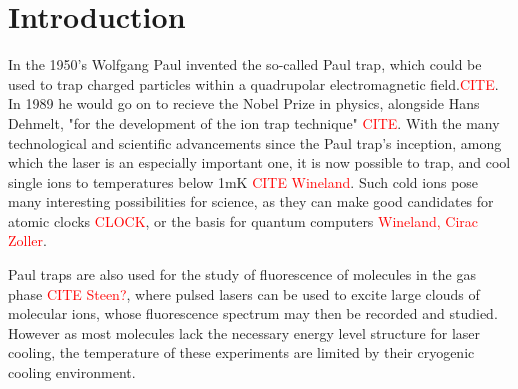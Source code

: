 
\chapter{Introduction}
\label{chap:intro}
In the 1950's Wolfgang Paul invented the so-called Paul trap, which could be used to trap charged particles within a quadrupolar electromagnetic field.\textcolor{red}{CITE}. In 1989 he would go on
 to recieve the Nobel Prize in physics, alongside Hans Dehmelt, "for the development of the ion trap technique" \textcolor{red}{CITE}.
 With the many technological and scientific advancements since the Paul trap's inception, among which the laser is an especially important one,
 it is now possible to trap, and cool single ions to temperatures below 1mK \textcolor{red}{CITE Wineland}.
 Such cold ions pose many interesting possibilities for science, as they can make good candidates for atomic clocks \textcolor{red}{CLOCK},
 or the basis for quantum computers \textcolor{red}{Wineland, Cirac Zoller}.

Paul traps are also used for the study of fluorescence of molecules in the gas phase \textcolor{red}{CITE Steen?},
where pulsed lasers can be used to excite large clouds of molecular ions, whose fluorescence spectrum may then be recorded and studied.
However as most molecules lack the necessary energy level structure for laser cooling, the temperature of these experiments are limited by their cryogenic cooling environment.